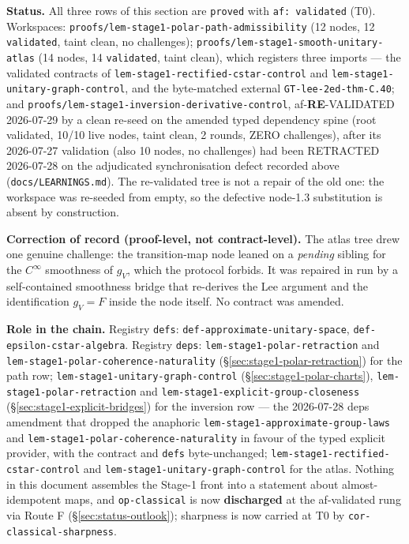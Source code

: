 \medskip
\noindent\textbf{Status.} All three rows of this section are \texttt{proved} with
\texttt{af: validated} (T0). Workspaces:
\texttt{proofs/lem-stage1-polar-path-admissibility} (12 nodes, 12 \texttt{validated}, taint
clean, no challenges); \texttt{proofs/lem-stage1-smooth-unitary-atlas} (14 nodes, 14
\texttt{validated}, taint clean), which registers three imports --- the validated contracts
of \texttt{lem-stage1-rectified-cstar-control} and
\texttt{lem-stage1-unitary-graph-control}, and the byte-matched external
\texttt{GT-lee-2ed-thm-C.40}; and
\texttt{proofs/lem-stage1-inversion-derivative-control}, af-\textbf{RE}-VALIDATED
2026-07-29 by a clean re-seed on the amended typed dependency spine (root validated,
10/10 live nodes, taint clean, 2 rounds, ZERO challenges), after its 2026-07-27 validation
(also 10 nodes, no challenges) had been RETRACTED 2026-07-28 on the adjudicated
synchronisation defect recorded above (\texttt{docs/LEARNINGS.md}). The re-validated tree
is not a repair of the old one: the workspace was re-seeded from empty, so the defective
node-1.3 substitution is absent by construction.

\noindent\textbf{Correction of record (proof-level, not contract-level).} The atlas tree
drew one genuine challenge: the transition-map node leaned on a \emph{pending} sibling for
the $C^{\infty}$ smoothness of $g_V$, which the protocol forbids. It was repaired in run by a
self-contained smoothness bridge that re-derives the Lee argument and the identification
$g_V=F$ inside the node itself. No contract was amended.

\noindent\textbf{Role in the chain.} Registry \texttt{defs}:
\texttt{def-approximate-unitary-space}, \texttt{def-epsilon-cstar-algebra}. Registry
\texttt{deps}: \texttt{lem-stage1-polar-retraction} and
\texttt{lem-stage1-polar-coherence-naturality} (\S\ref{sec:stage1-polar-retraction}) for the
path row; \texttt{lem-stage1-unitary-graph-control} (\S\ref{sec:stage1-polar-charts}),
\texttt{lem-stage1-polar-retraction} and \texttt{lem-stage1-explicit-group-closeness}
(\S\ref{sec:stage1-explicit-bridges}) for the inversion row --- the 2026-07-28 deps
amendment that dropped the anaphoric \texttt{lem-stage1-approximate-group-laws} and
\texttt{lem-stage1-polar-coherence-naturality} in favour of the typed explicit provider,
with the contract and \texttt{defs} byte-unchanged;
\texttt{lem-stage1-rectified-cstar-control} and \texttt{lem-stage1-unitary-graph-control}
for the atlas. Nothing in this document assembles the Stage-1 front into a statement about
almost-idempotent maps, and \texttt{op-classical} is now \textbf{discharged} at the af-validated rung via Route F (\S\ref{sec:status-outlook}); sharpness is now carried at T0 by \texttt{cor-classical-sharpness}.
